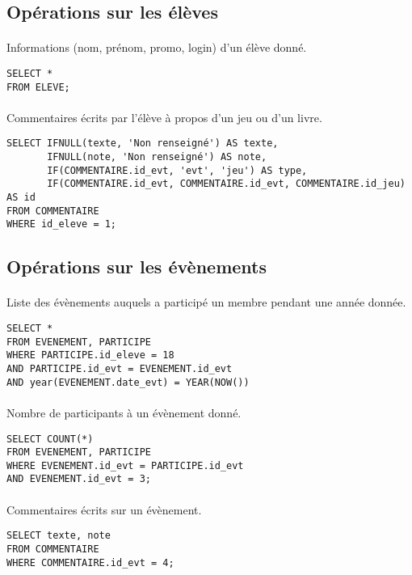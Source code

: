 \documentclass[a4paper, 11pt]{article}
\begin{document}
\subsection{Opérations sur les élèves}
\paragraph{}
Informations (nom, prénom, promo, login) d'un élève donné.
\begin{verbatim}
SELECT *
FROM ELEVE;
\end{verbatim}
\paragraph{}
Commentaires écrits par l'élève à propos d'un jeu ou d'un livre.
\begin{verbatim}
SELECT IFNULL(texte, 'Non renseigné') AS texte,
       IFNULL(note, 'Non renseigné') AS note,
       IF(COMMENTAIRE.id_evt, 'evt', 'jeu') AS type, 
       IF(COMMENTAIRE.id_evt, COMMENTAIRE.id_evt, COMMENTAIRE.id_jeu) AS id
FROM COMMENTAIRE
WHERE id_eleve = 1;
\end{verbatim}
\subsection{Opérations sur les évènements}
\paragraph{}
Liste des évènements auquels a participé un membre pendant une année donnée.
\begin{verbatim}
SELECT *
FROM EVENEMENT, PARTICIPE
WHERE PARTICIPE.id_eleve = 18
AND PARTICIPE.id_evt = EVENEMENT.id_evt
AND year(EVENEMENT.date_evt) = YEAR(NOW())
\end{verbatim}
\paragraph{}
Nombre de participants à un évènement donné.
\begin{verbatim}
SELECT COUNT(*)
FROM EVENEMENT, PARTICIPE
WHERE EVENEMENT.id_evt = PARTICIPE.id_evt
AND EVENEMENT.id_evt = 3;
\end{verbatim}
\paragraph{}
Commentaires écrits sur un évènement.
\begin{verbatim}
SELECT texte, note 
FROM COMMENTAIRE
WHERE COMMENTAIRE.id_evt = 4;
\end{verbatim}
\end{document}
